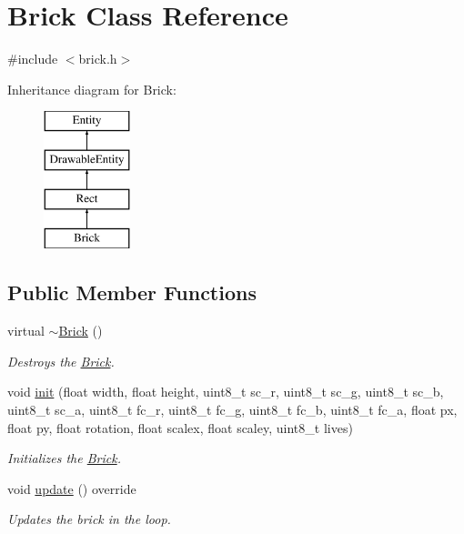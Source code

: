 \hypertarget{class_brick}{}\section{Brick Class Reference}
\label{class_brick}


{\ttfamily \#include $<$brick.\+h$>$}

Inheritance diagram for Brick\+:\begin{figure}[H]
\begin{center}
\leavevmode
\includegraphics[height=4.000000cm]{class_brick}
\end{center}
\end{figure}
\subsection*{Public Member Functions}
\begin{DoxyCompactItemize}
\item 
virtual \hyperlink{class_brick_a8e1f06c7d5ba84454515f016c907098c}{$\sim$\+Brick} ()
\begin{DoxyCompactList}\small\item\em Destroys the \hyperlink{class_brick}{Brick}. \end{DoxyCompactList}\item 
void \hyperlink{class_brick_a7dfd26b24b96fe84b8c8da2094382e4c}{init} (float width, float height, uint8\+\_\+t sc\+\_\+r, uint8\+\_\+t sc\+\_\+g, uint8\+\_\+t sc\+\_\+b, uint8\+\_\+t sc\+\_\+a, uint8\+\_\+t fc\+\_\+r, uint8\+\_\+t fc\+\_\+g, uint8\+\_\+t fc\+\_\+b, uint8\+\_\+t fc\+\_\+a, float px, float py, float rotation, float scalex, float scaley, uint8\+\_\+t lives)
\begin{DoxyCompactList}\small\item\em Initializes the \hyperlink{class_brick}{Brick}. \end{DoxyCompactList}\item 
void \hyperlink{class_brick_a4debb742abe5d19442d910bb8ecf083e}{update} () override
\begin{DoxyCompactList}\small\item\em Updates the brick in the loop. \end{DoxyCompactList}\end{DoxyCompactItemize}
